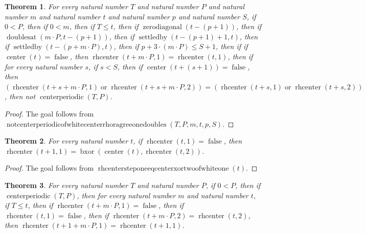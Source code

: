 \documentclass[11pt]{article}
\newtheorem{theorem}{Theorem}[section]
\theoremstyle{definition}
\begin{document}
\begin{theorem}
\label{ll:paper:not-centerperiodic-of-white-center-rhoragree-one-doubles}
For every natural number \(T\) and natural number \(P\) and natural number \(m\) and natural number \(t\) and natural number \(p\) and natural number \(S\), if \(0 < P\), then if \(0 < m\), then if \(T \le t\), then if \(\operatorname{zerodiagonal}(t - (p + 1))\), then if \(\operatorname{doublesat}(m \cdot P, t - (p + 1))\), then if \(\operatorname{settledby}(t - (p + 1) + 1, t)\), then if \(\operatorname{settledby}(t - (p + m \cdot P), t)\), then if \(p + 3 \cdot (m \cdot P) \le S + 1\), then if if \(\operatorname{center}(t) = \operatorname{false}\), then \(\operatorname{rhcenter}(t + m \cdot P, 1) = \operatorname{rhcenter}(t, 1)\), then if for every natural number \(s\), if \(s < S\), then if \(\operatorname{center}(t + (s + 1)) = \operatorname{false}\), then \((\operatorname{rhcenter}(t + s + m \cdot P, 1) \operatorname{or} \operatorname{rhcenter}(t + s + m \cdot P, 2)) = (\operatorname{rhcenter}(t + s, 1) \operatorname{or} \operatorname{rhcenter}(t + s, 2))\), then not \(\operatorname{centerperiodic}(T, P)\).
\end{theorem}
\begin{proof}
The goal follows from \(\operatorname{notcenterperiodicofwhitecenterrhoragreeonedoubles}(T, P, m, t, p, S)\).
\end{proof}
\begin{theorem}
\label{ll:paper:rhcenter-step-one-eq-center-xor-two-of-white-one}
For every natural number \(t\), if \(\operatorname{rhcenter}(t, 1) = \operatorname{false}\), then \(\operatorname{rhcenter}(t + 1, 1) = \operatorname{bxor}(\operatorname{center}(t), \operatorname{rhcenter}(t, 2))\).
\end{theorem}
\begin{proof}
The goal follows from \(\operatorname{rhcentersteponeeqcenterxortwoofwhiteone}(t)\).
\end{proof}
\begin{theorem}
\label{ll:paper:periodic-rhcenter-step-one-eq-of-white-one-and-two-eq}
For every natural number \(T\) and natural number \(P\), if \(0 < P\), then if \(\operatorname{centerperiodic}(T, P)\), then for every natural number \(m\) and natural number \(t\), if \(T \le t\), then if \(\operatorname{rhcenter}(t + m \cdot P, 1) = \operatorname{false}\), then if \(\operatorname{rhcenter}(t, 1) = \operatorname{false}\), then if \(\operatorname{rhcenter}(t + m \cdot P, 2) = \operatorname{rhcenter}(t, 2)\), then \(\operatorname{rhcenter}(t + 1 + m \cdot P, 1) = \operatorname{rhcenter}(t + 1, 1)\).
\end{theorem}
\end{document}
